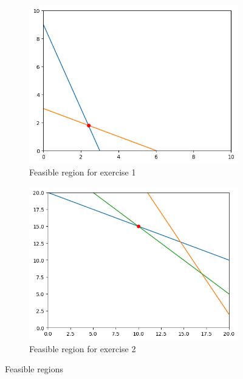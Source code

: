 \begin{figure}[H]
    \begin{subfigure}{0.5\textwidth}
        \includegraphics[width=\textwidth]{lab10/imgs/ex1.png}
        \caption{Feasible region for exercise 1}
    \end{subfigure}
    \begin{subfigure}{0.5\textwidth}
        \includegraphics[width=\textwidth]{lab10/imgs/ex2.png}
        \caption{Feasible region for exercise 2}
    \end{subfigure}
    \caption{Feasible regions}
    \label{fig:feasible}
\end{figure}

